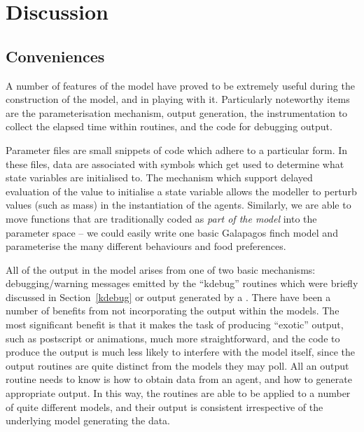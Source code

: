 
\section{Discussion}



\subsection{Conveniences}
A number of features of the model have proved to be extremely useful
during the construction of the model, and in playing with
it. Particularly noteworthy items are the parameterisation mechanism,
output generation, the instrumentation to collect the elapsed time
within routines, and the code for debugging output.

Parameter files are small snippets of \Scheme code which adhere to a
particular form. In these files, data are associated with symbols
which get used to determine what state variables are initialised to.
The mechanism which support delayed evaluation of the value to
initialise a state variable allows the modeller to perturb values
(such as mass) in the instantiation of the agents.  Similarly, we are
able to move functions that are traditionally coded as \emph{part of
  the model} into the parameter space -- we could easily write one
basic Galapagos finch model and parameterise the many different
behaviours and food preferences.

\vspace{3mm}
All of the output in the model arises from one of two basic
mechanisms: debugging/warning messages emitted by the ``kdebug''
routines which were briefly discussed in Section~\ref{kdebug} or
output generated by a \mlogger.  There have been a number of benefits
from not incorporating the output within the models.  The most
significant benefit is that it makes the task of producing ``exotic''
output, such as postscript or animations, much more straightforward,
and the code to produce the output is much less likely to interfere
with the model itself, since the output routines are quite distinct
from the models they may poll.  All an output routine needs to know is
how to obtain data from an agent, and how to generate appropriate
output. In this way, the  routines are able to be
applied to a number of quite different models, and their output is
consistent irrespective of the underlying model generating the data.

